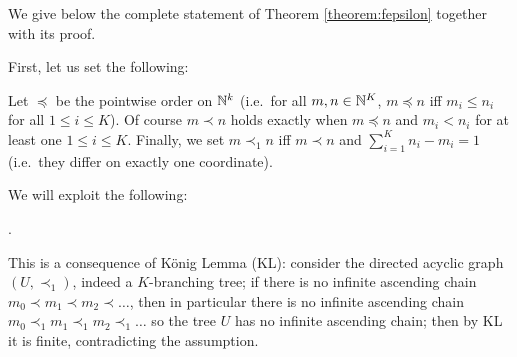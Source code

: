 We give below the complete statement of Theorem \ref{theorem:fepsilon} together with its proof.

First, let us set the following:
\begin{definition}
 Let $\preceq$ be the pointwise order on $\mathbb{N}^k$ (i.e.\ for all $ m  , n  \in \mathbb{N}^{K}$, $ m  \preceq  n  $ iff $m_{i}\leq n_{i}$ for all $1\leq i\leq K$).
 Of course $ m  \prec  n  $ holds exactly when $ m  \preceq  n  $ and $m_{i}<n_{i}$ for at least one $1\leq i\leq K$.
 Finally, we set $ m  \prec_{1} n  $  iff
$ m  \prec  n  $ and $\sum_{i=1}^{K}n_{i}-m_{i}=1$ (i.e.\ they differ on exactly one coordinate).
\end{definition}

We will exploit the following:

\begin{remark}\label{rmk:AC}
.

This is a consequence of K\"onig Lemma (KL): consider the directed acyclic graph $(U,\prec_{1})$, indeed a $K$-branching tree; if there is no infinite ascending chain $  m  _{0}\prec  m  _{1} \prec  m  _{2} \prec \dots$, then in particular there is no infinite ascending chain $  m  _{0}\prec_{1}  m  _{1} \prec_{1}  m  _{2} \prec_{1} \dots$ so the tree $U$ has no infinite ascending chain; then by KL it is finite, contradicting the assumption. 
\end{remark}

